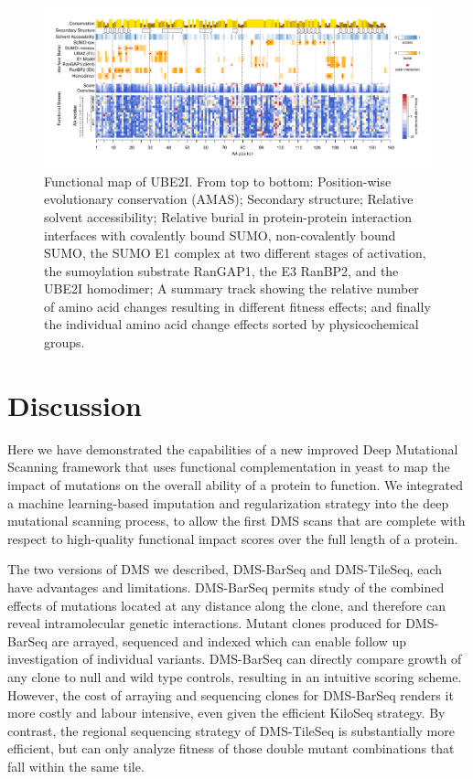 \begin{landscape}
\begin{figure}[h]
	\centering
	\includegraphics[width=9in]{img/ube2i_map.pdf}
	\caption{Functional map of UBE2I. From top to bottom: Position-wise evolutionary conservation (AMAS); Secondary structure; Relative solvent accessibility; Relative burial in protein-protein interaction interfaces with covalently bound SUMO, non-covalently bound SUMO, the SUMO E1 complex at two different stages of activation, the sumoylation substrate RanGAP1, the E3 RanBP2, and the UBE2I homodimer; A summary track showing the relative number of amino acid changes resulting in different fitness effects; and finally the individual amino acid change effects sorted by physicochemical groups.}
	\label{fig:ube2i-map}
\end{figure}
\end{landscape}


\section{Discussion}

Here we have demonstrated the capabilities of a new improved Deep Mutational Scanning framework that uses functional complementation in yeast to map the impact of mutations on the overall ability of a protein to function. We integrated a machine learning-based imputation and regularization strategy into the deep mutational scanning process, to allow the first DMS scans that are complete with respect to high-quality functional impact scores over the full length of a protein.

The two versions of DMS we described, DMS-BarSeq and DMS-TileSeq, each have advantages and limitations. DMS-BarSeq permits study of the combined effects of mutations located at any distance along the clone, and therefore can reveal intramolecular genetic interactions.  Mutant clones produced for DMS-BarSeq are arrayed, sequenced and indexed which can enable follow up investigation of individual variants. DMS-BarSeq can directly compare growth of any clone to null and wild type controls, resulting in an intuitive scoring scheme. However, the cost of arraying and sequencing clones for DMS-BarSeq renders it more costly and labour intensive, even given the efficient KiloSeq strategy. By contrast, the regional sequencing strategy of DMS-TileSeq is substantially more efficient, but can only analyze fitness of those double mutant combinations that fall within the same tile. 

